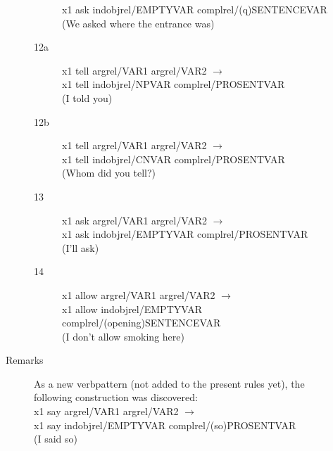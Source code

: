 \begin{description}
\begin{description}
\begin{description}
x1 ask indobjrel/EMPTYVAR complrel/(q)SENTENCEVAR \\
(We asked where the entrance was)
  \item[12a] x1 tell argrel/VAR1 argrel/VAR2 $\rightarrow$ \\
x1 tell indobjrel/NPVAR complrel/PROSENTVAR \\
(I told you)
  \item[12b] x1 tell argrel/VAR1 argrel/VAR2 $\rightarrow$ \\
x1 tell indobjrel/CNVAR complrel/PROSENTVAR \\
(Whom did you tell?)
  \item[13] x1 ask argrel/VAR1 argrel/VAR2 $\rightarrow$ \\
x1 ask indobjrel/EMPTYVAR complrel/PROSENTVAR \\
(I'll ask)
  \item[14] x1 allow argrel/VAR1 argrel/VAR2 $\rightarrow$ \\
x1 allow indobjrel/EMPTYVAR complrel/(opening)SENTENCEVAR \\
(I don't allow smoking here)
  \end{description}

\item[Remarks] As a new verbpattern (not added to the present rules yet), the 
following construction was discovered:\\
x1 say argrel/VAR1 argrel/VAR2 $\rightarrow$ \\
x1 say indobjrel/EMPTYVAR complrel/(so)PROSENTVAR \\
(I said so)
\end{description}


\end{description}
